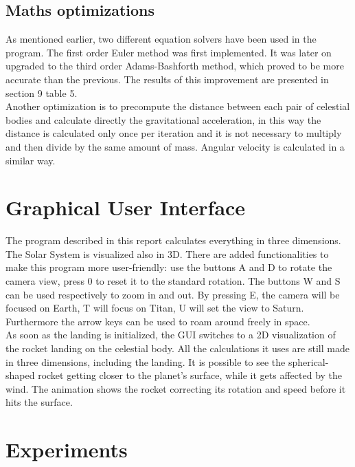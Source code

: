 \documentclass[10pt,a4paper]{article}
\begin{document}
	\subsection{Maths optimizations}
	As mentioned earlier, two different equation solvers have been used in the program. The first order Euler method was first implemented. It was later on upgraded to the third order Adams-Bashforth method, which proved to be more accurate than the previous. The results of this improvement are presented in section 9 table 5.\\
	Another optimization is to precompute the distance between each pair of celestial bodies and calculate directly the gravitational acceleration, in this way the distance is calculated only once per iteration and it is not necessary to multiply and then divide by the same amount of mass. Angular velocity is calculated in a similar way.
	
	\section{Graphical User Interface}
	The program described in this report calculates everything in three dimensions. The Solar System is visualized also in 3D. There are added functionalities to make this program more user-friendly: use the buttons A and D to rotate the camera view, press 0 to reset it to the standard rotation. The buttons W and S can be used respectively to zoom in and out. By pressing E, the camera will be focused on Earth, T will focus on Titan, U will set the view to Saturn. Furthermore the arrow keys can be used to roam around freely in space.\\
	
	As soon as the landing is initialized, the GUI switches to a 2D visualization of the rocket landing on the celestial body. All the calculations it uses are still made in three dimensions, including the landing. It is possible to see the spherical-shaped rocket getting closer to the planet's surface, while it gets affected by the wind. The animation shows the rocket correcting its rotation and speed before it hits the surface.
	
	
	\section{Experiments}
\end{document}
